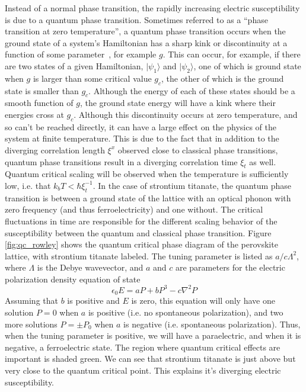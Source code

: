 \documentclass{thesis-umich}
\begin{document}
Instead of a normal phase transition, the rapidly increasing electric susceptibility is due to a quantum phase transition. Sometimes referred to as a ``phase transition at zero temperature'', a quantum phase transition occurs when the ground state of a system's Hamiltonian has a sharp kink or discontinuity at a function of some parameter~\cite{Coleman2005}, for example $g$. This can occur, for example, if there are two states of a given Hamiltonian, $|\psi_1\rangle$ and $|\psi_2\rangle$, one of which is ground state when $g$ is larger than some critical value $g_c$, the other of which is the ground state is smaller than $g_c$. Although the energy of each of these states should be a smooth function of $g$, the ground state energy will have a kink where their energies cross at $g_c$. Although this discontinuity occurs at zero temperature, and so can't be reached directly, it can have a large effect on the physics of the system at finite temperature. This is due to the fact that in addition to the diverging correlation length $\xi^x$ observed close to classical phase transitions, quantum phase transitions result in a diverging correlation time $\xi_t$ as well. Quantum critical scaling will be observed when the temperature is sufficiently low, i.e. that $k_bT < \hbar \xi_t^{-1}$. In the case of strontium titanate, the quantum phase transition is between a ground state of the lattice with an optical phonon with zero frequency (and thus ferroelectricity) and one without. The critical fluctuations in time are responsible for the different scaling behavior of the susceptibility between the quantum and classical phase transition. Figure \ref{fig:qc_rowley} shows the quantum critical phase diagram of the perovskite lattice, with strontium titanate labeled. The tuning parameter is listed as $a/c\Lambda^2$, where $\Lambda$ is the Debye wavevector, and $a$ and $c$ are parameters for the electric polarization density equation of state~\cite{Rowley2014}
\[ \epsilon_0 E = a P + b P^3 - c \nabla^2 P \]
Assuming that $b$ is positive and $E$ is zero, this equation will only have one solution $P=0$ when $a$ is positive (i.e. no spontaneous polarization), and two more solutions $P = \pm P_0$ when $a$ is negative (i.e. spontaneous polarization). Thus, when the tuning parameter is positive, we will have a paraelectric, and when it is negative, a ferroelectric state. The region where quantum critical effects are important is shaded green. We can see that strontium titanate is just above but very close to the quantum critical point. This explains it's diverging electric susceptibility.
\end{document}
